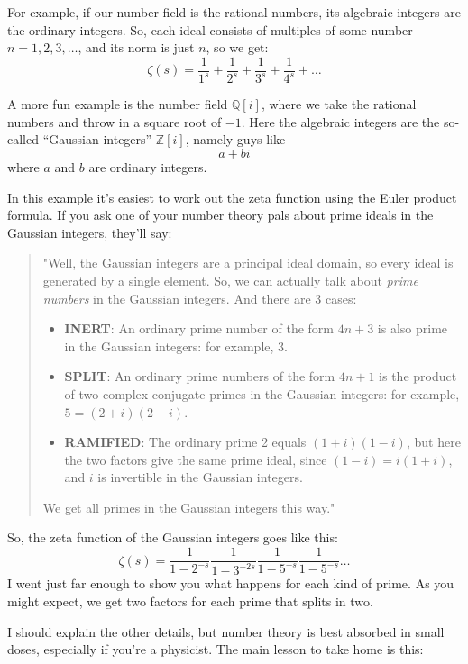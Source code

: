 \documentclass{article}
\def\tightlist{}
\begin{document}
For example, if our number field is the rational numbers, its algebraic
integers are the ordinary integers. So, each ideal consists of multiples
of some number \(n = 1,2,3,\ldots\), and its norm is just \(n\), so we
get:
\[\zeta(s) = \frac{1}{1^s} + \frac{1}{2^s} + \frac{1}{3^s} + \frac{1}{4^s} + \ldots\]

A more fun example is the number field \(\mathbb{Q}[i]\), where we take
the rational numbers and throw in a square root of \(-1\). Here the
algebraic integers are the so-called ``Gaussian integers''
\(\mathbb{Z}[i]\), namely guys like \[a + bi\] where \(a\) and \(b\) are
ordinary integers.

In this example it's easiest to work out the zeta function using the
Euler product formula. If you ask one of your number theory pals about
prime ideals in the Gaussian integers, they'll say:

\begin{quote}
"Well, the Gaussian integers are a principal ideal domain, so every
ideal is generated by a single element. So, we can actually talk about
\emph{prime numbers} in the Gaussian integers. And there are 3 cases:

\begin{itemize}
\tightlist
\item
  \textbf{INERT}: An ordinary prime number of the form \(4n+3\) is also
  prime in the Gaussian integers: for example, 3.
\item
  \textbf{SPLIT}: An ordinary prime numbers of the form \(4n+1\) is the
  product of two complex conjugate primes in the Gaussian integers: for
  example, \(5 = (2+i)(2-i)\).
\item
  \textbf{RAMIFIED}: The ordinary prime 2 equals \((1+i)(1-i)\), but
  here the two factors give the same prime ideal, since
  \((1-i) = i(1+i)\), and \(i\) is invertible in the Gaussian integers.
\end{itemize}

We get all primes in the Gaussian integers this way."
\end{quote}

So, the zeta function of the Gaussian integers goes like this:
\[\zeta(s) = \frac{1}{1 - 2^{-s}} \frac{1}{1 - 3^{-2s}} \frac{1}{1 - 5^{-s}} \frac{1}{1 - 5^{-s}} \ldots\]
I went just far enough to show you what happens for each kind of prime.
As you might expect, we get two factors for each prime that splits in
two.

I should explain the other details, but number theory is best absorbed
in small doses, especially if you're a physicist. The main lesson to
take home is this:
\end{document}
